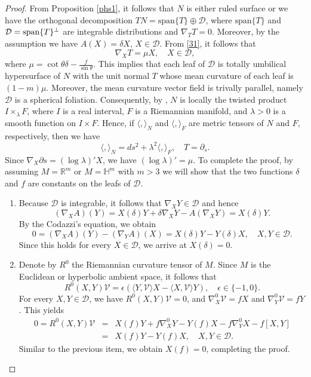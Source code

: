 \documentclass[12pt]{amsart}
\def\r{\mathbb R}
\def\h{\mathbb H}
\def\v{\mathcal V}
\theoremstyle{definition}
\begin{document}
\begin{proof}
From Proposition \ref{phs1}, it follows that $N$ is either ruled surface or we have the orthogonal decomposition $TN=\mbox{span}\{T\}\oplus \mathcal{D}$, where $\mbox{span}\{T\}$ and $ \mathcal{D} =\textnormal{span}\{T\}^\perp$ are integrable distributions and $\nabla_TT=0$. Moreover, by the assumption we have $A(X)=\delta X$, $X\in \mathcal{D}$. From \eqref{31}, it follows that
$$
\nabla_X T=\mu X, \quad X\in \mathcal{D},
$$
where $\mu=\cot\theta\delta-\frac{f}{\sin\theta}$. This implies that each leaf of $\mathcal{D}$ is totally umbilical hypersurface of $N$ with the unit normal $T$ whose mean curvature of each leaf is $(1-m)\mu$. Moreover, the mean curvature vector field is trivally parallel, namely $\mathcal{D}$ is a spherical foliation. Consequently, by \cite[Proposition 3]{pr}, $N$ is locally the twisted product $I\times_\lambda F$, where $I$ is a real interval, $F$ is a Riemannian manifold, and $\lambda >0$ is a smooth function on $I\times F$. Hence, if $\langle,\rangle_N$ and $\langle,\rangle_F$ are metric tensors of $N$ and $F$, respectively, then we have
$$
\langle,\rangle_N=ds^2+\lambda^2 \langle,\rangle_F, \quad T=\partial_s.
$$
Since $\nabla_X \partial s=(\log \lambda)'X$, we have $(\log \lambda)'=\mu$. To complete the proof, by assuming $M=\r^m$ or $M=\h^m$ with $m>3$ we will show that the two functions $\delta$ and $f$ are constants on the leafs of $\mathcal{D}$. 
\begin{enumerate}
\item Because $\mathcal{D}$ is integrable, it follows that $\nabla_XY\in \mathcal{D}$ and hence
$$
(\nabla_X A)(Y)=X(\delta)Y+\delta\nabla_XY-A(\nabla_XY)=X(\delta)Y.
$$
By the Codazzi's equation, we obtain
$$
0=(\nabla_X A)(Y)-(\nabla_Y A)(X)=X(\delta)Y-Y(\delta)X, \quad X,Y\in \mathcal{D}.
$$
Since this holds for every $X\in \mathcal{D}$, we arrive at $X(\delta)=0$.
\item Denote by $R^0$ the Riemannian curvature tensor of $M$. Since $M$ is the Euclidean or hyperbolic ambient space, it follows that
$$
R^0(X,Y)\v=\epsilon(\langle Y,\v \rangle X-\langle X,\v \rangle Y), \quad \epsilon\in\{-1,0\}.
$$
For every $X,Y\in\mathcal{D}$, we have $R^0(X,Y)\v=0$, and $\nabla^0_X\v=fX$ and $\nabla_Y^0\v=fY$. This yields
\begin{eqnarray*}
0=R^0(X,Y)\v&=&X(f)Y+f\nabla^0_XY-Y(f)X-f\nabla^0_YX-f[X,Y]\\
&=&X(f)Y-Y(f)X, \quad X,Y\in \mathcal{D}.
\end{eqnarray*}
Similar to the previous item, we obtain $X(f)=0$, completing the proof.
\end{enumerate}
\end{proof}
\end{document}

